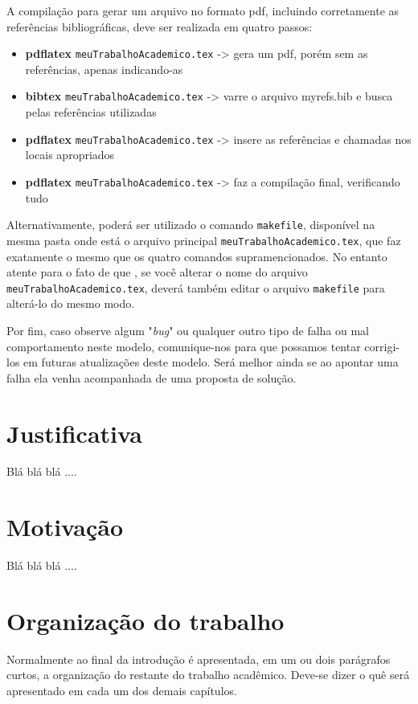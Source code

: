 A compilação para gerar um arquivo no formato pdf, incluindo corretamente as referências bibliográficas, deve ser realizada em quatro passos:

\begin{itemize}
    \item \textbf{pdflatex} \verb|meuTrabalhoAcademico.tex|    -> gera um pdf, porém sem as referências, apenas indicando-as
    \item \textbf{bibtex} \verb|meuTrabalhoAcademico.tex|   -> varre o arquivo myrefs.bib e busca pelas referências utilizadas
    \item \textbf{pdflatex} \verb|meuTrabalhoAcademico.tex| -> insere as referências e chamadas nos locais apropriados
    \item \textbf{pdflatex} \verb|meuTrabalhoAcademico.tex| -> faz a compilação final, verificando tudo
\end{itemize}

Alternativamente, poderá ser utilizado o comando \verb|makefile|, disponível na mesma pasta onde está o arquivo principal \verb|meuTrabalhoAcademico.tex|, que faz exatamente o mesmo que os quatro comandos supramencionados. No entanto atente para o fato de que , se você alterar o nome do arquivo \verb|meuTrabalhoAcademico.tex|, deverá também editar o arquivo \verb|makefile| para alterá-lo do mesmo modo.

Por fim, caso observe algum "\textit{bug}"{} ou qualquer outro tipo de falha ou mal comportamento neste modelo, comunique-nos para que possamos tentar corrigi-los em futuras atualizações deste modelo. Será melhor ainda se ao apontar uma falha ela venha acompanhada de uma proposta de solução.

\section{Justificativa}
\label{sec:justificativa}

Blá blá blá ....

\section{Motivação}
\label{sec:motivacao}

Blá blá blá ....

\section{Organização do trabalho}
\label{sec:organizacaoTrabalho}

Normalmente ao final da introdução é apresentada, em um ou dois parágrafos curtos, a organização do restante do trabalho acadêmico. Deve-se dizer o quê será apresentado em cada um dos demais capítulos.
